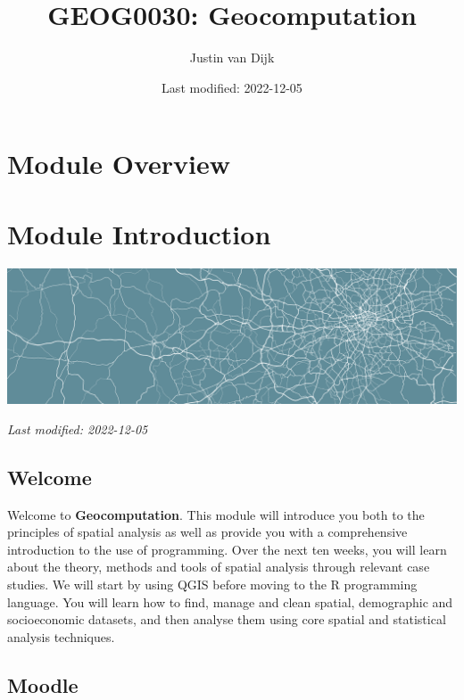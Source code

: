 \documentclass[
]{book}
\title{GEOG0030: Geocomputation}
\author{Justin van Dijk}
\date{Last modified: 2022-12-05}
\begin{document}
\maketitle

{
\setcounter{tocdepth}{1}
\tableofcontents
}
\hypertarget{module-overview}{%
\chapter*{Module Overview}\label{module-overview}}

\hypertarget{module-introduction}{%
\chapter*{Module Introduction}\label{module-introduction}}

\begin{center}\includegraphics[width=1\linewidth]{images/general/geocomputation_welcome} \end{center}

\emph{Last modified: 2022-12-05}

\hypertarget{welcome}{%
\section*{Welcome}\label{welcome}}

Welcome to \textbf{Geocomputation}. This module will introduce you both to the principles of spatial analysis as well as provide you with a comprehensive introduction to the use of programming. Over the next ten weeks, you will learn about the theory, methods and tools of spatial analysis through relevant case studies. We will start by using QGIS before moving to the R programming language. You will learn how to find, manage and clean spatial, demographic and socioeconomic datasets, and then analyse them using core spatial and statistical analysis techniques.

\hypertarget{moodle}{%
\section*{Moodle}\label{moodle}}
\end{document}
